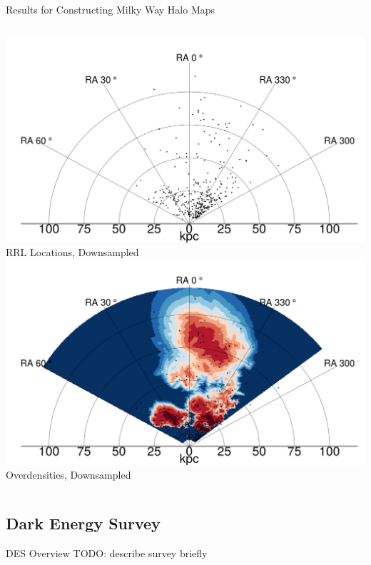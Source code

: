 \documentclass[12pt]{beamer}
\newcommand{\todo}[1]{{\color{red}TODO: #1}}
\begin{document}
\begin{frame}{Results for Constructing Milky Way Halo Maps}
\begin{columns}
    \begin{column}{0.5\textwidth}
      \begin{center}
    \includegraphics[scale=\tw]{figs/density_rr_model_sampled_points.png}\\
    RRL Locations, Downsampled\\
    \includegraphics[scale=\tw]{figs/density_rr_model_sampled.png}\\
    Overdensities, Downsampled
    \end{center}
  \end{column}

\end{columns}
\end{frame}




\subsection{Dark Energy Survey}

\begin{frame}{DES Overview}
\todo{describe survey briefly}
\end{frame}
\end{document}

